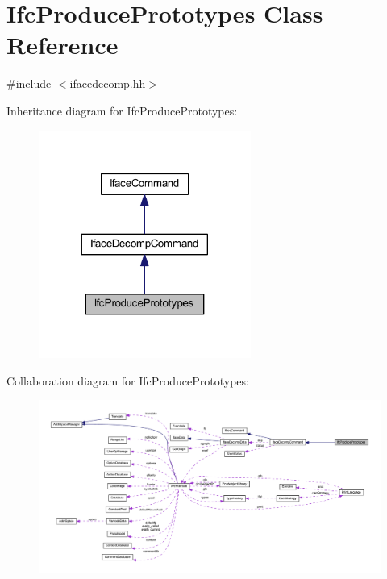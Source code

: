 \hypertarget{class_ifc_produce_prototypes}{}\section{Ifc\+Produce\+Prototypes Class Reference}
\label{class_ifc_produce_prototypes}


{\ttfamily \#include $<$ifacedecomp.\+hh$>$}



Inheritance diagram for Ifc\+Produce\+Prototypes\+:
\nopagebreak
\begin{figure}[H]
\begin{center}
\leavevmode
\includegraphics[width=197pt]{class_ifc_produce_prototypes__inherit__graph}
\end{center}
\end{figure}


Collaboration diagram for Ifc\+Produce\+Prototypes\+:
\nopagebreak
\begin{figure}[H]
\begin{center}
\leavevmode
\includegraphics[width=350pt]{class_ifc_produce_prototypes__coll__graph}
\end{center}
\end{figure}
